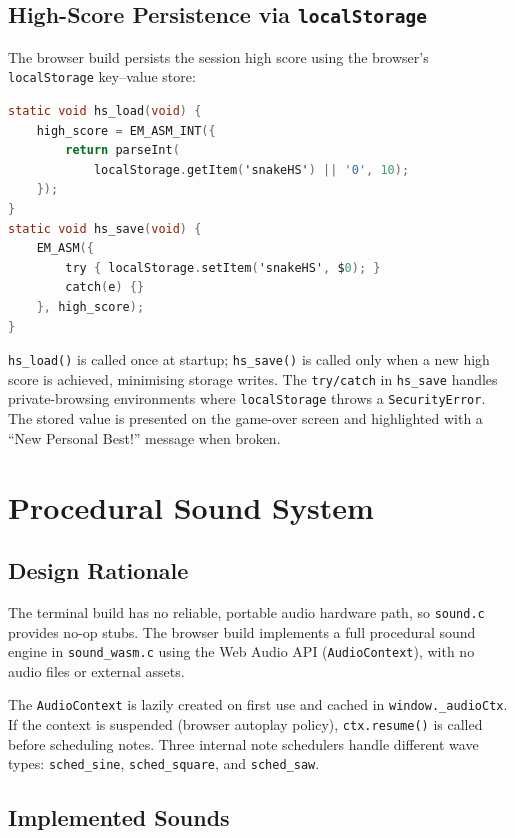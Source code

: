 \documentclass[conference]{IEEEtran}
\begin{document}
\subsection{High-Score Persistence via \texttt{localStorage}}

The browser build persists the session high score using the browser's
\texttt{localStorage} key--value store:

\begin{lstlisting}[language=C]
static void hs_load(void) {
    high_score = EM_ASM_INT({
        return parseInt(
            localStorage.getItem('snakeHS') || '0', 10);
    });
}
static void hs_save(void) {
    EM_ASM({
        try { localStorage.setItem('snakeHS', $0); }
        catch(e) {}
    }, high_score);
}
\end{lstlisting}

\texttt{hs\_load()} is called once at startup; \texttt{hs\_save()} is called
only when a new high score is achieved, minimising storage writes. The
\texttt{try/catch} in \texttt{hs\_save} handles private-browsing environments
where \texttt{localStorage} throws a \texttt{SecurityError}. The stored value
is presented on the game-over screen and highlighted with a ``New Personal
Best!'' message when broken.

\section{Procedural Sound System}
\label{sec:sound}

\subsection{Design Rationale}

The terminal build has no reliable, portable audio hardware path, so
\texttt{sound.c} provides no-op stubs. The browser build implements a full
procedural sound engine in \texttt{sound\_wasm.c} using the Web Audio API
(\texttt{AudioContext}), with no audio files or external assets.

The \texttt{AudioContext} is lazily created on first use and cached in
\texttt{window.\_audioCtx}. If the context is suspended (browser autoplay
policy), \texttt{ctx.resume()} is called before scheduling notes. Three
internal note schedulers handle different wave types: \texttt{sched\_sine},
\texttt{sched\_square}, and \texttt{sched\_saw}.

\subsection{Implemented Sounds}
\end{document}

